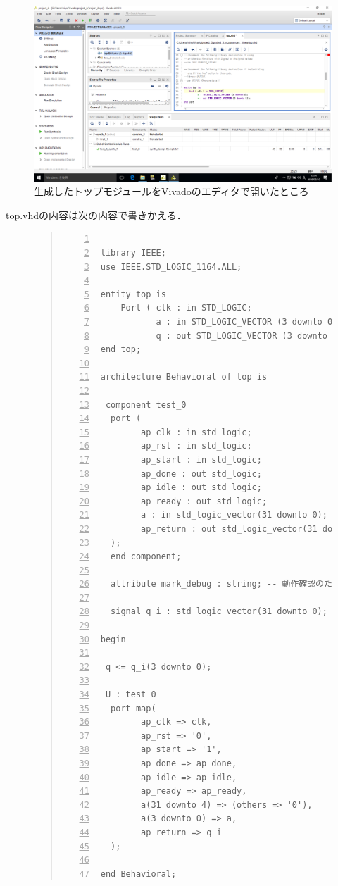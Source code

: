 \documentclass[a4paper,dvipdfmx]{jsarticle}
\begin{document}
 \begin{figure}[H]
  \begin{center}
   \includegraphics[width=.8\textwidth]{chapter08_figures/VirtualBox_Windows10_19_03_2018_23_34_16.png}
  \end{center}
  \caption{生成したトップモジュールをVivadoのエディタで開いたところ}
 \end{figure}

top.vhdの内容は次の内容で書きかえる．
\begin{figure}[H]
\begin{quote}
\begin{Verbatim}[frame=single, numbers=left, baselinestretch=0.8]

library IEEE;
use IEEE.STD_LOGIC_1164.ALL;

entity top is
    Port ( clk : in STD_LOGIC;
           a : in STD_LOGIC_VECTOR (3 downto 0);
           q : out STD_LOGIC_VECTOR (3 downto 0));
end top;

architecture Behavioral of top is

 component test_0
  port (
        ap_clk : in std_logic;
        ap_rst : in std_logic;
        ap_start : in std_logic;
        ap_done : out std_logic;
        ap_idle : out std_logic;
        ap_ready : out std_logic;
        a : in std_logic_vector(31 downto 0);
        ap_return : out std_logic_vector(31 downto 0)
  );
  end component;
  
  attribute mark_debug : string; -- 動作確認のためにmark_debugアトリビュートを使う
  
  signal q_i : std_logic_vector(31 downto 0);
  
begin

 q <= q_i(3 downto 0);

 U : test_0
  port map(
        ap_clk => clk,
        ap_rst => '0',
        ap_start => '1',
        ap_done => ap_done,
        ap_idle => ap_idle,
        ap_ready => ap_ready,
        a(31 downto 4) => (others => '0'),
        a(3 downto 0) => a,
        ap_return => q_i
  );

end Behavioral;
  \end{Verbatim}
 \end{quote}
\end{figure}
\end{document}
